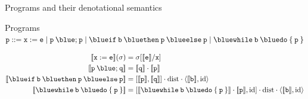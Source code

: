 \documentclass{beamer}
\begin{document}
\begin{frame}{Programs and their denotational semantics}
	\begin{block}{Programs}
        $\prog{p} ::= \mathtt{x} := \mathtt{e} \mid
	\mathtt{p \> {\blue ;} \> p} \mid
	\mathtt{{\blue if} \> b \> {\blue then} \> p \> {\blue else} \> p} \mid
	\mathtt{{\blue while} \> b \> {\blue do} \> \{ \> p \> \}}$
	\end{block}

        \begin{align*}
                \sem{\prog{x : = e}}(\sigma) & = \sigma[\sem{\prog{e}}/\prog{x}] \\
                \sem{\prog{p} \> {\blue ;} \> \prog{q}} & 
                = \sem{\prog{q}} \comp \sem{\prog{p}} \\
                \sem{\mathtt{{\blue if} \> b \> {\blue then} \> p \> {\blue else} \> p}}
                                                        & 
                                                        = [\sem{\prog{p}},\sem{\prog{q}}] \comp
                                                        \mathrm{dist} \comp \pv{\sem{\prog{b}}}{\id}
                \\
                \sem{\mathtt{{\blue while} \> b \> {\blue do} \> \{ \> p \> \}} }
                                                        & = 
                [\sem{\mathtt{{\blue while} \> b \> {\blue do} \> \{ \> p \> \}} } \comp 
                \sem{\prog{p}},\id] \comp
                \mathrm{dist} \comp \pv{\sem{\prog{b}}}{\id}
        \end{align*}
\end{frame}
\end{document}
